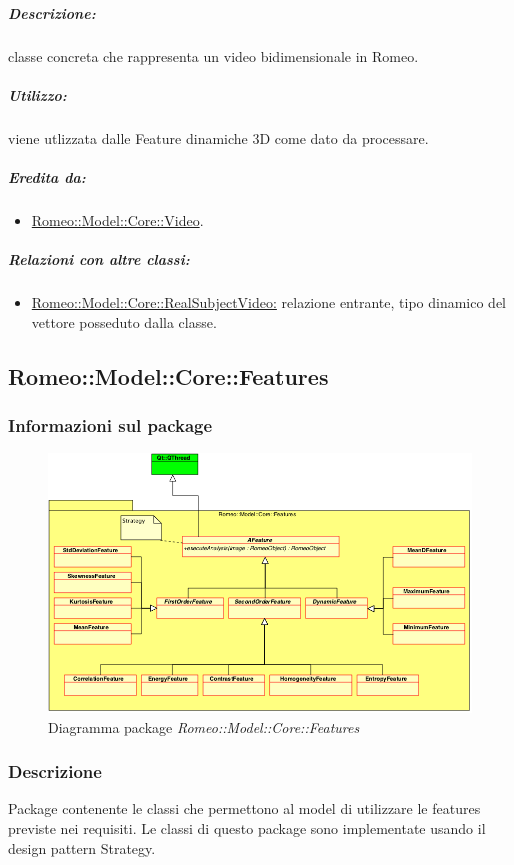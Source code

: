 			\subparagraph{Descrizione:} classe concreta che rappresenta un video bidimensionale in Romeo\g{}.
			
			\subparagraph{Utilizzo:} viene utlizzata dalle Feature\g{} dinamiche 3D come dato da processare.
			
			\subparagraph{Eredita da:}
				\begin{itemize}
					\item \hyperref[]{Romeo::Model::Core::Video}.
				\end{itemize}
				
			\subparagraph{Relazioni con altre classi:}
				\begin{itemize}
					\item \hyperref[]{Romeo::Model::Core::RealSubjectVideo:} relazione entrante, tipo dinamico del vettore posseduto dalla classe.
				\end{itemize}

	\subsection{Romeo::Model::Core::Features}
	\label{romeo::model::core::features}
		\subsubsection{Informazioni sul package}
		\begin{figure}[!h]
			\centering
			\includegraphics[width=1.1\linewidth]{./Content/Immagini/Romeo__Model__Core__Adapters__Features.png}
			\caption{Diagramma package \textsl{Romeo::Model::Core::Features}}
		\end{figure}	
		
		\subsubsection{Descrizione}
		Package\g{} contenente le classi che permettono al model di utilizzare le features\glossary{} previste nei requisiti. Le classi di questo package\g{} sono implementate usando il design pattern\g{} Strategy.
		
